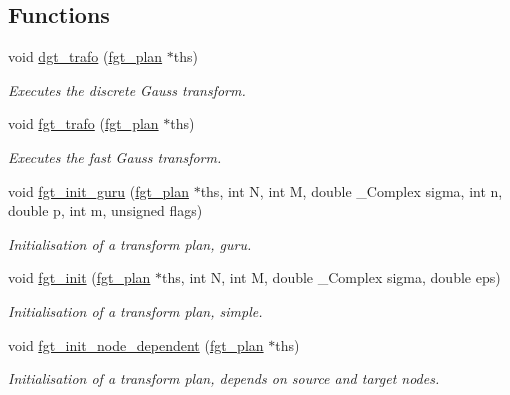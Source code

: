 \subsection*{Functions}
\begin{CompactItemize}
\item 
void \hyperlink{group__applications__fastgauss_g42f141fc768ced46eb2dac284b063b80}{dgt\_\-trafo} (\hyperlink{structfgt__plan}{fgt\_\-plan} $\ast$ths)
\begin{CompactList}\small\item\em Executes the discrete Gauss transform. \item\end{CompactList}\item 
void \hyperlink{group__applications__fastgauss_gb12b6f7c36927db24d8555484dcdfde0}{fgt\_\-trafo} (\hyperlink{structfgt__plan}{fgt\_\-plan} $\ast$ths)
\begin{CompactList}\small\item\em Executes the fast Gauss transform. \item\end{CompactList}\item 
void \hyperlink{group__applications__fastgauss_g902eb9182c72c3c9293084a70523ebff}{fgt\_\-init\_\-guru} (\hyperlink{structfgt__plan}{fgt\_\-plan} $\ast$ths, int N, int M, double \_\-Complex sigma, int n, double p, int m, unsigned flags)
\begin{CompactList}\small\item\em Initialisation of a transform plan, guru. \item\end{CompactList}\item 
void \hyperlink{group__applications__fastgauss_g44cf9a6fb0a16df875f613f343fd5c65}{fgt\_\-init} (\hyperlink{structfgt__plan}{fgt\_\-plan} $\ast$ths, int N, int M, double \_\-Complex sigma, double eps)
\begin{CompactList}\small\item\em Initialisation of a transform plan, simple. \item\end{CompactList}\item 
void \hyperlink{group__applications__fastgauss_g9d8f6229d33bc49f618838b21b3dd7fc}{fgt\_\-init\_\-node\_\-dependent} (\hyperlink{structfgt__plan}{fgt\_\-plan} $\ast$ths)
\begin{CompactList}\small\item\em Initialisation of a transform plan, depends on source and target nodes. \item\end{CompactList}\item 

\end{CompactItemize}
